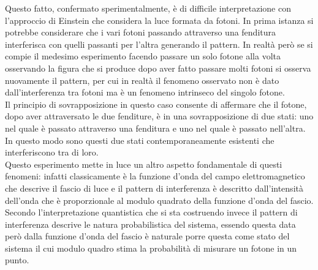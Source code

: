 Questo fatto, confermato sperimentalmente, è di difficile interpretazione con l'approccio di Einstein che considera la luce formata da fotoni. In prima istanza si potrebbe considerare che i vari fotoni passando attraverso una fenditura interferisca con quelli passanti per l'altra generando il pattern. In realtà però se si compie il medesimo esperimento facendo passare un solo fotone alla volta osservando la figura che si produce dopo aver fatto passare molti fotoni si osserva nuovamente il pattern, per cui in realtà il fenomeno osservato non è dato dall'interferenza tra fotoni ma è un fenomeno intrinseco del singolo fotone.\\ Il principio di sovrapposizione in questo caso consente di affermare che il fotone, dopo aver attraversato le due fenditure, è in una sovrapposizione di due stati: uno nel quale è passato attraverso una fenditura e uno nel quale è passato nell'altra. In questo modo sono questi due stati contemporaneamente esistenti che interferiscono tra di loro.\\

Questo esperimento mette in luce un altro aspetto fondamentale di questi fenomeni: infatti classicamente è la funzione d'onda del campo elettromagnetico che descrive il fascio di luce e il pattern di interferenza è descritto dall'intensità dell'onda che è proporzionale al modulo quadrato della funzione d'onda del fascio. Secondo l'interpretazione quantistica che si sta costruendo invece il pattern di interferenza descrive le natura probabilistica del sistema, essendo questa data però dalla funzione d'onda del fascio è naturale porre questa come stato del sistema il cui modulo quadro stima la probabilità di misurare un fotone in un punto. 


